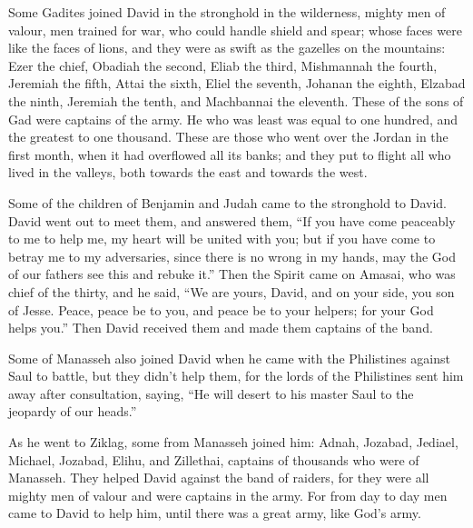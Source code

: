  Some Gadites joined David in the stronghold in the
wilderness, mighty men of valour, men trained for war, who could handle
shield and spear; whose faces were like the faces of lions, and they
were as swift as the gazelles on the mountains:  Ezer the
chief, Obadiah the second, Eliab the third,  Mishmannah the
fourth, Jeremiah the fifth,  Attai the sixth, Eliel the
seventh,  Johanan the eighth, Elzabad the ninth,
 Jeremiah the tenth, and Machbannai the eleventh.
 These of the sons of Gad were captains of the army. He who
was least was equal to one hundred, and the greatest to one thousand.
 These are those who went over the Jordan in the first
month, when it had overflowed all its banks; and they put to flight all
who lived in the valleys, both towards the east and towards the west.

 Some of the children of Benjamin and Judah came to the
stronghold to David.  David went out to meet them, and
answered them, ``If you have come peaceably to me to help me, my heart
will be united with you; but if you have come to betray me to my
adversaries, since there is no wrong in my hands, may the God of our
fathers see this and rebuke it.''  Then the Spirit came on
Amasai, who was chief of the thirty, and he said, ``We are yours, David,
and on your side, you son of Jesse. Peace, peace be to you, and peace be
to your helpers; for your God helps you.'' Then David received them and
made them captains of the band.

 Some of Manasseh also joined David when he came with the
Philistines against Saul to battle, but they didn't help them, for the
lords of the Philistines sent him away after consultation, saying, ``He
will desert to his master Saul to the jeopardy of our heads.''

 As he went to Ziklag, some from Manasseh joined him:
Adnah, Jozabad, Jediael, Michael, Jozabad, Elihu, and Zillethai,
captains of thousands who were of Manasseh.  They helped
David against the band of raiders, for they were all mighty men of
valour and were captains in the army.  For from day to day
men came to David to help him, until there was a great army, like God's
army.

